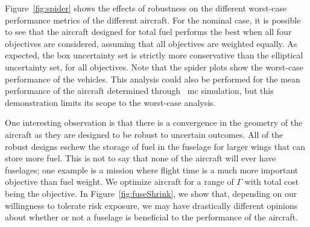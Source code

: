 Figure~\ref{fig:spider} shows the effects of robustness on
the different worst-case performance metrics of the different aircraft.
For the nominal case, it is possible to see that
the aircraft designed for total fuel performs the best when all four objectives are considered,
assuming that all objectives are weighted equally. As expected,
the box uncertainty set is strictly more conservative than the elliptical uncertainty set, for
all objectives. Note that the spider plots show the worst-case performance of the vehicles.
This analysis could also be performed for the mean performance
of the aircraft determined through ~\gls{mc} simulation, but this demonstration limits
its scope to the worst-case analysis.

One interesting observation is that there is a convergence in the geometry of the aircraft as they are designed
to be robust to uncertain outcomes. All of the robust designs eschew the storage of fuel in the fuselage
for larger wings that can store more fuel. This is not to say that none of the aircraft will ever have
fuselages; one example is a mission where flight time is a much more important objective
than fuel weight. We optimize aircraft for a range of $\Gamma$ with total cost
being the objective. In Figure~\ref{fig:fuseShrink}, we show that,
depending on our willingness to tolerate risk exposure, we
may have drastically different opinions about whether or not a fuselage is beneficial
to the performance of the aircraft.

